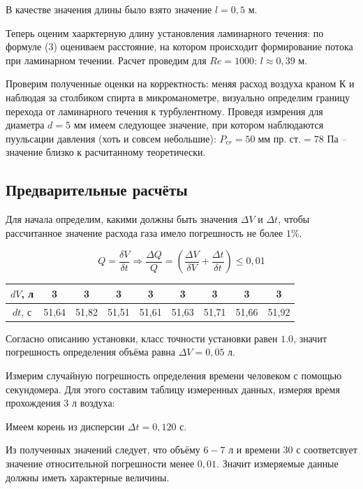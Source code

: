 \documentclass[a4paper, 12pt]{article} %
\begin{document}
В качестве значения длины было взято значение $l = 0,5$ м.

Теперь оценим хаарктерную  длину установления ламинарного течения: по формуле (3) оцениваем расстояние, на котором происходит формирование потока при ламинарном течении. Расчет проведим для $Re = 1000$: $l \approx 0,39$ м.

Проверим полученные оценки на корректность: меняя расход воздуха краном К и наблюдая за столбиком спирта в микроманометре, визуально определим границу перехода от ламинарного течения к турбулентному. Проведя измрения для диаметра $d = 5$ мм имеем следующее значение, при котором наблюдаются пуульсации давления (хоть и совсем небольшие): $P_{cr} = 50 \; \text{мм пр. ст.} =  78$ Па -- значение близко к расчитанному теоретически.

\subsection{Предварительные расчёты}

Для начала определим, какими должны быть значения $\Delta V$ и $\Delta t$, чтобы рассчитанное значение расхода газа имело погрешность не более $1\%$.
 
\begin{equation}
	Q = \frac{\delta V}{\delta t} \Rightarrow \frac{\Delta Q}{Q} =  \left( \frac{\Delta V}{\delta V} + \frac{\Delta t}{\delta t} \right) \leqslant 0,01
\end{equation}

\begin{center}
	\begin{tabular}{|c|c|c|c|c|c|c|c|c|}
		\hline
		$dV$, л & 3     & 3     & 3     & 3     & 3     & 3     & 3     & 3     \\ \hline
		$dt$, с & 51,64 & 51,82 & 51,51 & 51,61 & 51,63 & 51,71 & 51,66 & 51,92 \\ \hline
	\end{tabular}
\end{center}

Согласно описанию установки, класс точности установки равен $1.0$, значит погрешность определения объёма равна $\Delta V = 0,05$ л.

Измерим случайную погрешность определения времени человеком с помощью секундомера. Для этого составим таблицу измеренных данных, измеряя время прохождения 3 л воздуха:

Имеем корень из дисперсии $\Delta t = 0,120$ с.

Из полученных значений следует, что объёму $6-7$ л и времени $30$ с соответсвует значение относительной погрешности менее $0,01$. Значит измеряемые данные должны иметь характерные величины.
\end{document}
